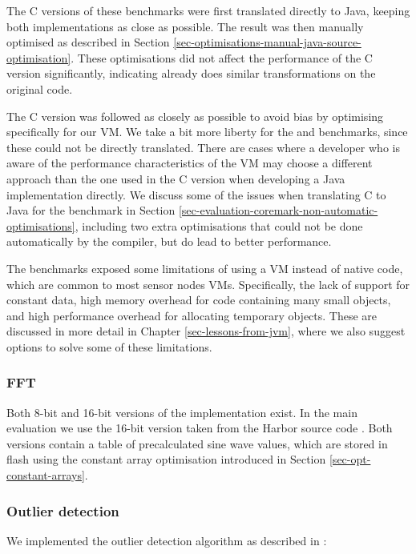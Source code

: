 The C versions of these benchmarks were first translated directly to Java, keeping both implementations as close as possible. The result was then manually optimised as described in Section \ref{sec-optimisations-manual-java-source-optimisation}. These optimisations did not affect the performance of the C version significantly, indicating  already does similar transformations on the original code.

The C version was followed as closely as possible to avoid bias by optimising specifically for our VM. We take a bit more liberty for the  and  benchmarks, since these could not be directly translated. There are cases where a developer who is aware of the performance characteristics of the VM may choose a different approach than the one used in the C version when developing a Java implementation directly. We discuss some of the issues when translating C to Java for the  benchmark in Section \ref{sec-evaluation-coremark-non-automatic-optimisations}, including two extra optimisations that could not be done automatically by the compiler, but do lead to better performance.

The benchmarks exposed some limitations of using a VM instead of native code, which are common to most sensor nodes VMs. Specifically, the lack of support for constant data, high memory overhead for code containing many small objects, and high performance overhead for allocating temporary objects. These are discussed in more detail in Chapter \ref{sec-lessons-from-jvm}, where we also suggest options to solve some of these limitations.

\subsubsection{FFT}
Both 8-bit and 16-bit versions of the  implementation exist. In the main evaluation we use the 16-bit version taken from the Harbor source code \cite{sos-operating-system}. Both versions contain a table of precalculated sine wave values, which are stored in flash using the constant array optimisation introduced in Section \ref{sec-opt-constant-arrays}.

\subsubsection{Outlier detection}
We implemented the outlier detection algorithm as described in \cite{Kumar:2007ge}:

